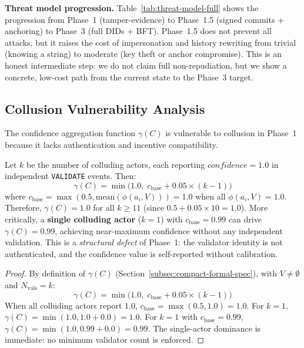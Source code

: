 \textbf{Threat model progression.} Table~\ref{tab:threat-model-full} shows the progression from Phase~1 (tamper-evidence) to Phase~1.5 (signed commits + anchoring) to Phase~3 (full DIDs + BFT). Phase~1.5 does not prevent all attacks, but it raises the cost of impersonation and history rewriting from trivial (knowing a string) to moderate (key theft or anchor compromise). This is an honest intermediate step: we do not claim full non-repudiation, but we show a concrete, low-cost path from the current state to the Phase~3 target.

\subsection{Collusion Vulnerability Analysis}\label{app:collusion-analysis}

The confidence aggregation function $\gamma(C)$ is vulnerable to collusion in Phase~1 because it lacks authentication and incentive compatibility.

\begin{lemma}\label{lem:collusion-upper-bound}
Let $k$ be the number of colluding actors, each reporting $\mathit{confidence} = 1.0$ in independent \texttt{VALIDATE} events. Then:
\begin{equation}
    \gamma(C) = \min\bigl(1.0,\; c_{\text{base}} + 0.05 \times (k - 1)\bigr)
\end{equation}
where $c_{\text{base}} = \max(0.5, \text{mean}(\phi(a_i, V))) = 1.0$ when all $\phi(a_i, V) = 1.0$. Therefore, $\gamma(C) = 1.0$ for all $k \geq 11$ (since $0.5 + 0.05 \times 10 = 1.0$). More critically, a \textbf{single colluding actor} ($k = 1$) with $c_{\text{base}} = 0.99$ can drive $\gamma(C) = 0.99$, achieving near-maximum confidence without any independent validation. This is a \emph{structural defect} of Phase~1: the validator identity is not authenticated, and the confidence value is self-reported without calibration.
\end{lemma}

\begin{proof}
By definition of $\gamma(C)$ (Section~\ref{subsec:compact-formal-spec}), with $V \neq \emptyset$ and $N_{\text{vals}} = k$:
\begin{equation}
    \gamma(C) = \min\bigl(1.0,\; c_{\text{base}} + 0.05 \times (k - 1)\bigr)
\end{equation}
When all colluding actors report $1.0$, $c_{\text{base}} = \max(0.5, 1.0) = 1.0$. For $k = 1$, $\gamma(C) = \min(1.0, 1.0 + 0.0) = 1.0$. For $k = 1$ with $c_{\text{base}} = 0.99$, $\gamma(C) = \min(1.0, 0.99 + 0.0) = 0.99$. The single-actor dominance is immediate: no minimum validator count is enforced.
\end{proof}


